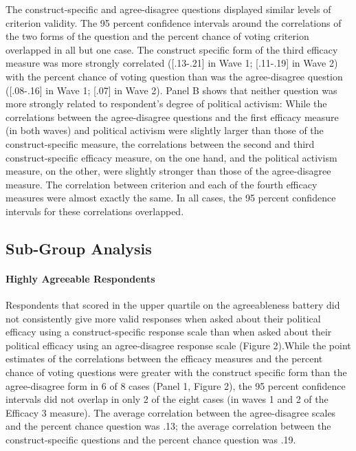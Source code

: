 \documentclass[man,apacite,floatsintext]{apa6}
\begin{document}
The construct-specific and agree-disagree questions displayed similar levels of criterion validity. The 95 percent confidence intervals around the correlations of the two forms of the question and the percent chance of voting criterion overlapped in all but one case. The construct specific form of the third efficacy measure was more strongly correlated ([.13-.21] in Wave 1; [.11-.19] in Wave 2) with the percent chance of voting question than was the agree-disagree question ([.08-.16] in Wave 1; [.07] in Wave 2). Panel B shows that neither question was more strongly related to respondent's degree of political activism: While the correlations between the agree-disagree questions and the first efficacy measure (in both waves) and political activism were slightly larger than those of the construct-specific measure, the correlations between the second and third construct-specific efficacy measure, on the one hand, and the political activism measure, on the other, were slightly stronger than those of the agree-disagree measure. The correlation between criterion and each of the fourth efficacy measures were almost exactly the same. In all cases, the 95 percent confidence intervals for these correlations overlapped. 

\subsection{Sub-Group Analysis}
\paragraph{Highly Agreeable Respondents}
Respondents that scored in the upper quartile on the agreeableness battery did not consistently give more valid responses when asked about their political efficacy using a construct-specific response scale than when asked about their political efficacy using an agree-disagree response scale (Figure 2).While the point estimates of the correlations between the efficacy measures and the percent chance of voting questions were greater with the construct specific form than the agree-disagree form in 6 of 8 cases (Panel 1, Figure 2), the 95 percent confidence intervals did not overlap in only 2 of the eight cases (in waves 1 and 2 of the Efficacy 3 measure). The average correlation between the agree-disagree scales and the percent chance question was .13; the average correlation between the construct-specific questions and the percent chance question was .19. 
\end{document}
